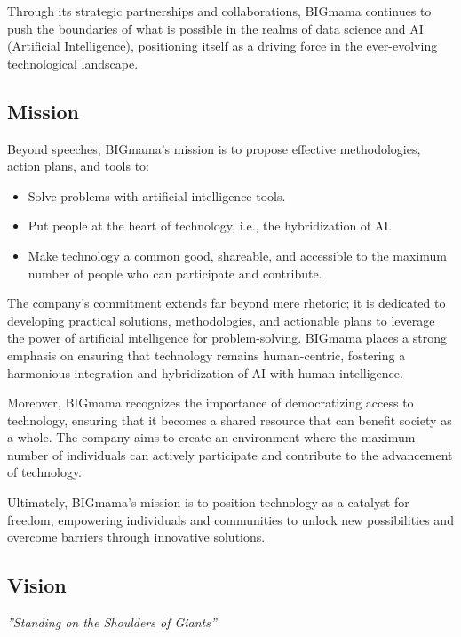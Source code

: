 Through its strategic partnerships and collaborations, BIGmama continues to push the boundaries of what is possible in the realms of data science and AI (Artificial Intelligence), positioning itself as a driving force in the ever-evolving technological landscape.

\subsection{Mission}

Beyond speeches, BIGmama's mission is to propose effective methodologies, action plans, and tools to:

\begin{itemize}
    \item Solve problems with artificial intelligence tools.
    \item Put people at the heart of technology, i.e., the hybridization of AI.
    \item Make technology a common good, shareable, and accessible to the maximum number of people who can participate and contribute.
\end{itemize}

The company's commitment extends far beyond mere rhetoric; it is dedicated to developing practical solutions, methodologies, and actionable plans to leverage the power of artificial intelligence for problem-solving. BIGmama places a strong emphasis on ensuring that technology remains human-centric, fostering a harmonious integration and hybridization of AI with human intelligence.

Moreover, BIGmama recognizes the importance of democratizing access to technology, ensuring that it becomes a shared resource that can benefit society as a whole. The company aims to create an environment where the maximum number of individuals can actively participate and contribute to the advancement of technology.

Ultimately, BIGmama's mission is to position technology as a catalyst for freedom, empowering individuals and communities to unlock new possibilities and overcome barriers through innovative solutions.

\subsection{Vision}

\begin{flushright}
    \small{\it{''Standing on the Shoulders of Giants''}}
\end{flushright}


